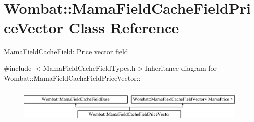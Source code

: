 \hypertarget{classWombat_1_1MamaFieldCacheFieldPriceVector}{
\section{Wombat::MamaFieldCacheFieldPriceVector Class Reference}
\label{classWombat_1_1MamaFieldCacheFieldPriceVector}
}


\hyperlink{classWombat_1_1MamaFieldCacheField}{MamaFieldCacheField}: Price vector field.  


{\ttfamily \#include $<$MamaFieldCacheFieldTypes.h$>$}Inheritance diagram for Wombat::MamaFieldCacheFieldPriceVector::\begin{figure}[H]
\begin{center}
\leavevmode
\includegraphics[height=1.73375cm]{classWombat_1_1MamaFieldCacheFieldPriceVector}
\end{center}
\end{figure}
